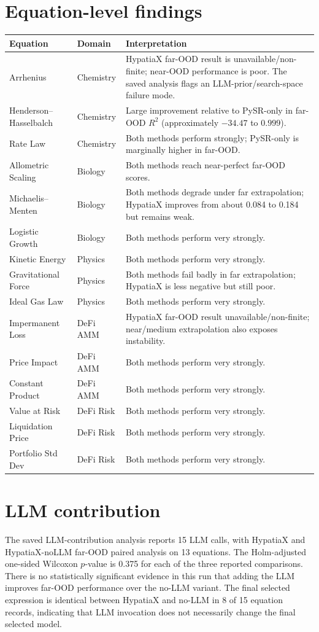 \documentclass[11pt,a4paper]{article}
\begin{document}
\section{Equation-level findings}
\begin{longtable}{p{35mm}p{30mm}p{85mm}}
\toprule
Equation & Domain & Interpretation\\
\midrule
Arrhenius & Chemistry & HypatiaX far-OOD result is unavailable/non-finite; near-OOD performance is poor. The saved analysis flags an LLM-prior/search-space failure mode.\\
Henderson--Hasselbalch & Chemistry & Large improvement relative to PySR-only in far-OOD $R^2$ (approximately $-34.47$ to $0.999$).\\
Rate Law & Chemistry & Both methods perform strongly; PySR-only is marginally higher in far-OOD.\\
Allometric Scaling & Biology & Both methods reach near-perfect far-OOD scores.\\
Michaelis--Menten & Biology & Both methods degrade under far extrapolation; HypatiaX improves from about 0.084 to 0.184 but remains weak.\\
Logistic Growth & Biology & Both methods perform very strongly.\\
Kinetic Energy & Physics & Both methods perform very strongly.\\
Gravitational Force & Physics & Both methods fail badly in far extrapolation; HypatiaX is less negative but still poor.\\
Ideal Gas Law & Physics & Both methods perform very strongly.\\
Impermanent Loss & DeFi AMM & HypatiaX far-OOD result unavailable/non-finite; near/medium extrapolation also exposes instability.\\
Price Impact & DeFi AMM & Both methods perform very strongly.\\
Constant Product & DeFi AMM & Both methods perform very strongly.\\
Value at Risk & DeFi Risk & Both methods perform very strongly.\\
Liquidation Price & DeFi Risk & Both methods perform very strongly.\\
Portfolio Std Dev & DeFi Risk & Both methods perform very strongly.\\
\bottomrule
\end{longtable}
\section{LLM contribution}
The saved LLM-contribution analysis reports 15 LLM calls, with HypatiaX and
HypatiaX-noLLM far-OOD paired analysis on 13 equations. The Holm-adjusted
one-sided Wilcoxon $p$-value is 0.375 for each of the three reported
comparisons. There is no statistically significant evidence in this run
that adding the LLM improves far-OOD performance over the no-LLM variant.
The final selected expression is identical between HypatiaX and no-LLM in
8 of 15 equation records, indicating that LLM invocation does not necessarily
change the final selected model.
\end{document}
